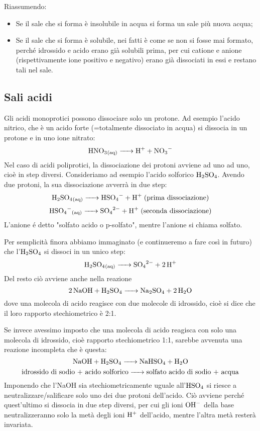 \vspace{0.2cm}Riassumendo:

\begin{itemize}[leftmargin=0.5cm]
   \item Se il sale che si forma è insolubile in acqua si forma un sale più nuova acqua;
   \item Se il sale che si forma è solubile, nei fatti è come se non si fosse mai formato, perché idrossido e acido erano già solubili prima, per cui catione e anione (rispettivamente ione positivo e negativo) erano già dissociati in essi e restano tali nel sale.
\end{itemize}

\subsection{Sali acidi}
Gli acidi monoprotici possono dissociare solo un protone. Ad esempio l'acido nitrico, che è un acido forte (=totalmente dissociato in acqua) si dissocia in un protone e in uno ione nitrato:
$$\ce{HNO_3_{(aq)} -> H+ + NO_3^-}$$
Nel caso di acidi poliprotici, la dissociazione dei protoni avviene ad uno ad uno, cioè in step diversi.
Consideriamo ad esempio l'acido solforico $\rm H_2SO_4$. Avendo due protoni, la sua dissociazione avverrà in due step:
$$\ce{H_2SO_4_{(aq)} -> HSO_4- + H+}\; \text{(prima dissociazione)}$$
$$\ce{HSO_4^-_{(aq)} -> SO_4^{2-} + H+}\; \text{(seconda dissociazione)}$$
L'anione  é detto "solfato acido o p-solfato", mentre l'anione  si chiama solfato.

Per semplicità finora abbiamo immaginato (e continueremo a fare così in futuro) che l'$\rm H_2SO_4$ si dissoci in un unico step:
$$\ce{H_2SO_4_{(aq)} -> SO_4^{2-} + 2  H+}$$
Del resto ciò avviene anche nella reazione
$$\ce{2 NaOH + H_2SO_4 -> Na_2SO_4 + 2 H_2O}$$
dove una molecola di acido reagisce con due molecole di idrossido, cioè si dice che il loro rapporto stechiometrico è 2:1.

Se invece avessimo imposto che una molecola di acido reagisca con solo una molecola di idrossido, cioè rapporto stechiometrico 1:1, sarebbe avvenuta una reazione incompleta che è questa:
$$\ce{NaOH + H_2SO_4 -> NaHSO_4 + H_2O}$$
$$\text{idrossido di sodio + acido solforico}\ce{->}\text{solfato acido di sodio + acqua}$$
Imponendo che l'NaOH sia stechiometricamente uguale all'$\rm HSO_4$ si riesce a neutralizzare/salificare solo uno dei due protoni dell'acido. Ciò avviene perché quest'ultimo si dissocia in due step diversi, per cui gli ioni $\rm OH^-$ della base neutralizzeranno solo la metà degli ioni $\rm H^+$ dell'acido, mentre l'altra metà resterà invariata.

